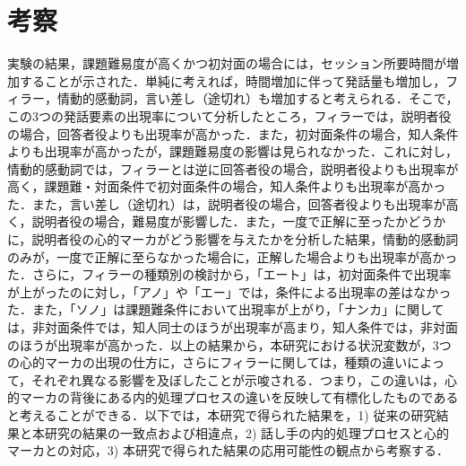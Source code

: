 \documentclass[japanese]{jnlp_1.3a}
\begin{document}
\section{考察}
実験の結果，課題難易度が高くかつ初対面の場合には，セッション所要時間が増加することが示された．単純に考えれば，時間増加に伴って発話量も増加し，フィラー，情動的感動詞，言い差し（途切れ）も増加すると考えられる．そこで，この3つの発話要素の出現率について分析したところ，フィラーでは，説明者役の場合，回答者役よりも出現率が高かった．また，初対面条件の場合，知人条件よりも出現率が高かったが，課題難易度の影響は見られなかった．これに対し，情動的感動詞では，フィラーとは逆に回答者役の場合，説明者役よりも出現率が高く，課題難・対面条件で初対面条件の場合，知人条件よりも出現率が高かった．また，言い差し（途切れ）は，説明者役の場合，回答者役よりも出現率が高く，説明者役の場合，難易度が影響した．また，一度で正解に至ったかどうかに，説明者役の心的マーカがどう影響を与えたかを分析した結果，情動的感動詞のみが，一度で正解に至らなかった場合に，正解した場合よりも出現率が高かった．さらに，フィラーの種類別の検討から，「エート」は，初対面条件で出現率が上がったのに対し，「アノ」や「エー」では，条件による出現率の差はなかった．また，「ソノ」は課題難条件において出現率が上がり，「ナンカ」に関しては，非対面条件では，知人同士のほうが出現率が高まり，知人条件では，非対面のほうが出現率が高かった．以上の結果から，本研究における状況変数が，3つの心的マーカの出現の仕方に，さらにフィラーに関しては，種類の違いによって，それぞれ異なる影響を及ぼしたことが示唆される．つまり，この違いは，心的マーカの背後にある内的処理プロセスの違いを反映して有標化したものであると考えることができる．以下では，本研究で得られた結果を，1) 従来の研究結果と本研究の結果の一致点および相違点，2) 話し手の内的処理プロセスと心的マーカとの対応，3) 本研究で得られた結果の応用可能性の観点から考察する．
\end{document}
